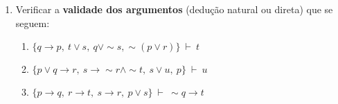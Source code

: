 \documentclass[12pt, a4paper,final]{article}
\begin{document}
\begin{enumerate}

\itemsep 1cm

\item Verificar a \textbf{validade dos argumentos} (dedu\c c\~ao natural ou direta) que se seguem:
\begin{enumerate}








\item $\{q \rightarrow p, ~ t \vee s, ~ q \vee \sim s, \sim(p \vee r)  \} ~\vdash~ t $


\item $\{ p \vee q \rightarrow r,~ s \rightarrow \sim r \wedge \sim t,~ s \vee u, ~ p \} ~\vdash~  u$ 

\item $\{ p \rightarrow q,~ r \rightarrow t,~ s \rightarrow r,~ p \vee s \} ~\vdash~ \sim q \rightarrow t $











\end{enumerate}
\end{enumerate}
\end{document}
